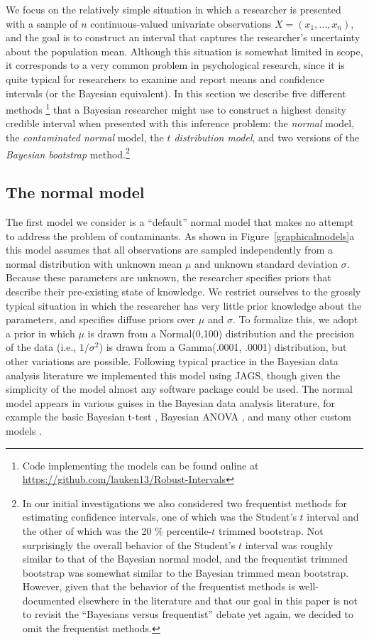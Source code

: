\documentclass[doc]{apa6}
\begin{document}
{We focus on the relatively simple situation in which a researcher is presented with a sample of $n$ continuous-valued  univariate observations $X=(x_1,\ldots,x_n)$, and the goal is to construct an interval that captures the researcher's uncertainty about the population mean. Although this situation is somewhat limited in scope, it corresponds to a very common problem in psychological research, since it is quite typical for researchers to examine and report means and confidence intervals (or the Bayesian equivalent).  In this section we describe     five   different     methods \footnote{Code implementing the models can be found online at \url{https://github.com/lauken13/Robust-Intervals}} that a Bayesian researcher might use to construct a   highest density   credible interval when presented with this inference problem: the {\it normal} model, the {\it contaminated normal} model,    the {\it $t$ distribution model},   and two versions of the {\it Bayesian bootstrap} method.\footnote{In our initial investigations we also considered two frequentist methods for estimating confidence intervals, one of which was the Student's $t$ interval and the other of which was the 20 \% percentile-$t$ trimmed bootstrap. Not surprisingly the overall behavior of the Student's $t$ interval was roughly similar to that of the Bayesian normal model, and the frequentist trimmed bootstrap was somewhat similar to the Bayesian trimmed mean bootstrap. However, given that the behavior of the frequentist methods is well-documented elsewhere in the literature and that our goal in this paper is not to revisit the ``Bayesians versus frequentist'' debate yet again, we decided to omit the frequentist methods.}


\subsection{The normal model}

The first model we consider is a ``default'' normal model that makes no attempt to address the problem of contaminants. As shown in Figure~\ref{graphicalmodels}a this model assumes that all observations are sampled independently from a normal distribution with unknown mean $\mu$ and unknown standard deviation $\sigma$. Because these parameters are unknown, the researcher specifies priors that describe their pre-existing state of knowledge. We restrict ourselves to the grossly typical situation in which the researcher has very little prior knowledge about the parameters, and specifies diffuse priors over $\mu$ and $\sigma$. To formalize this, we adopt a prior in which $\mu$ is drawn from a Normal(0,100) distribution and the precision of the data (i.e., $1/\sigma^2$) is drawn from a Gamma(.0001, .0001) distribution, but other variations are possible. Following typical practice in the Bayesian data analysis literature we implemented this model using JAGS, though given the simplicity of the model almost any software package could be used. The normal model appears in various guises in the Bayesian data analysis literature, for example the basic Bayesian t-test \parencite{wetzels2009quantify}, Bayesian ANOVA \parencite{rouder2012default}, and many other custom models \parencite{lee2014bayesian}.


}
\end{document}
